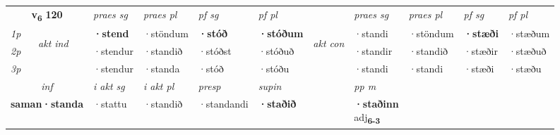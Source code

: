 \noindent
\begin{tabular}{lllllllllll} \toprule
\multicolumn{2}{c}{\textbf{v{\textsubscript{6}}} \Large{\textbf{120}}}  &  \textit{praes sg}  & \textit{praes pl}  &\textit{ pf sg} & \textit{pf pl} &  &  \textit{praes sg}  & \textit{praes pl}  & \textit{pf sg} & \textit{pf pl } \\*
	\cmidrule{3-6} \cmidrule{8-11}
 {\textit{1p}} & \multirow{3}{*}{\begin{turn}{90}\textit{akt ind}\end{turn}} & \textbf{·stend} & ·stöndum & \textbf{·stóð} & \textbf{·stóðum} & \multirow{3}{*}{\begin{turn}{90}\textit{akt con}\end{turn}} &·standi & ·stöndum & \textbf{·stæði} & ·stæðum\\*
 {\textit{2p}} &  &  ·stendur  & ·standið & ·stóðst & ·stóðuð & & ·standir & ·standið & ·stæðir & ·stæðuð \\*
{\textit{3p}} &  & ·stendur & ·standa & ·stóð & ·stóðu & & ·standi & ·standi& ·stæði & ·stæðu \\*
\cmidrule{3-6} \cmidrule{8-11}

   \multicolumn{2}{c}{\textit{inf}}  & \textit{i akt sg} & \textit{i akt pl}   & \textit{presp} & \textit{supin}  && \textit{pp m} \\*
  \multicolumn{2}{c}{\textbf{saman\allowbreak ·standa}} & ·stattu  & ·standið   & ·standandi &  \textbf{·staðið}  && \specialcell{\textbf{·staðinn} \\ adj\textbf{\textsubscript{6-3}}} \\*
\end{tabular}

